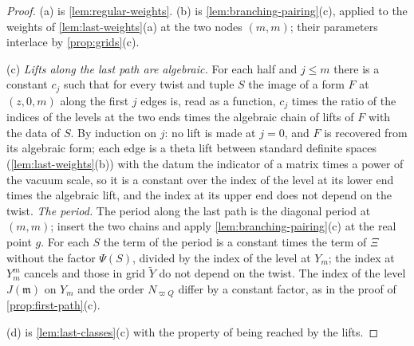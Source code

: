 \begin{proof}
(a) is \cref{lem:regular-weights}. (b) is \cref{lem:branching-pairing}(c), applied to the weights of \cref{lem:last-weights}(a) at the two nodes $(m,m)$; their parameters interlace by
\cref{prop:grids}(c).

(c) \emph{Lifts along the last path are algebraic.} For each half and $j\le m$ there is a constant $c_j$ such that for every twist and tuple $S$ the image of a form $F$ at $(z,0,m)$ along the first $j$ edges is, read as a function, $c_j$
times the ratio of the indices of the levels at the two ends times the algebraic chain of lifts of $F$ with the data of $S$. By induction on $j$: no lift is made at $j=0$, and $F$ is recovered from its algebraic form; each edge is a
theta lift between standard definite spaces (\cref{lem:last-weights}(b)) with the datum the indicator of a matrix times a power of the vacuum scale, so it is a constant over the index of the level at its lower end times the
algebraic lift, and the index at its upper end does not depend on the twist. \emph{The period.} The period along the last path is the diagonal period at $(m,m)$; insert the two chains and apply \cref{lem:branching-pairing}(c) at the
real point $g$. For each $S$ the term of the period is a constant times the term of $\Xi$ without the factor $\Psi(S)$, divided by the index of the level at $Y_m$; the index at $Y^m_m$ cancels and those in grid $\tilde Y$ do not depend
on the twist. The index of the level $J(\mathfrak m)$ on $Y_m$ and the order $N_{\varpi Q}$ differ by a constant factor, as in the proof of \cref{prop:first-path}(c).

(d) is \cref{lem:last-classes}(c) with the property of being reached by the lifts.


\end{proof}
